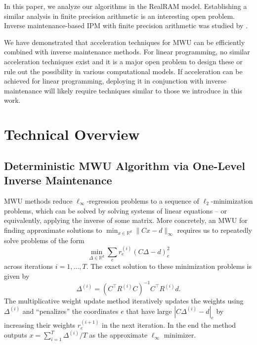 \documentclass[11pt]{article}
\newcommand\dd{\boldsymbol{\mathit{d}}}
\newcommand\rr{\boldsymbol{\mathit{r}}}
\newcommand\xx{\boldsymbol{\mathit{x}}}
\newcommand\CC{\boldsymbol{\mathit{C}}}
\newcommand\RR{\boldsymbol{\mathit{R}}}
\begin{document}
In this paper, we analyze our algorithms in the RealRAM model. Establishing a similar analysis in finite precision arithmetic is an interesting open problem. Inverse maintenance-based IPM with finite precision arithmetic was studied by \cite{ghadiri2023bit}.

We have demonstrated that acceleration techniques for MWU can be efficiently combined with inverse maintenance methods. 
For linear programming, no similar acceleration techniques exist and it is a major open problem to design these or rule out the possibility in various computational models. 
If acceleration can be achieved for linear programming, deploying it in conjunction with inverse maintenance will likely require techniques similar to those we introduce in this work.

 \section{Technical Overview}

\subsection{Deterministic MWU Algorithm via One-Level Inverse Maintenance}
MWU methods reduce $\ell_\infty$-regression problems to a sequence of $\ell_2$-minimization problems, which can be solved by solving systems of linear equations -- or equivalently, applying the inverse of some matrix. More concretely, an MWU for finding approximate solutions to $\min_{\xx\in \mathbb{R}^d} \|\CC\xx-\dd\|_{\infty}$ requires us to repeatedly solve problems of the form 
\[
\min_{\Delta\in \mathbb{R}^d}\sum_e \rr^{(i)}_e(\CC\Delta-\dd)_e^2
\]
across iterations $i = 1,\ldots,T$.
The exact solution to these minimization problems is given by
\[
\Delta^{(i)} = (\CC^{\top}\RR^{(i)}\CC)^{-1}\CC^{\top}\RR^{(i)}\dd.
\]
The multiplicative weight update method iteratively updates the weights using $\Delta^{(i)}$ and ``penalizes'' the coordinates $e$ that have large $|\CC \Delta^{(i)} - \dd|_e$ by increasing their weights $\rr_e^{(i+1)}$ in the next iteration. In the end the method outputs $\xx =  \sum_{i=1}^T \Delta^{(i)} / T$ as the approximate $\ell_\infty$ minimizer. 
\end{document}
